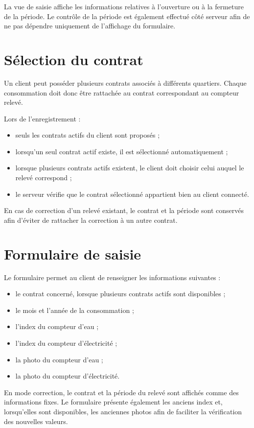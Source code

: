 La vue de saisie affiche les informations relatives à l'ouverture ou à la fermeture de la période. Le contrôle de la période est également effectué côté serveur afin de ne pas dépendre uniquement de l'affichage du formulaire.

\section{Sélection du contrat}

Un client peut posséder plusieurs contrats associés à différents quartiers. Chaque consommation doit donc être rattachée au contrat correspondant au compteur relevé.

Lors de l'enregistrement :
\begin{itemize}
    \item seuls les contrats actifs du client sont proposés ;
    \item lorsqu'un seul contrat actif existe, il est sélectionné automatiquement ;
    \item lorsque plusieurs contrats actifs existent, le client doit choisir celui auquel le relevé correspond ;
    \item le serveur vérifie que le contrat sélectionné appartient bien au client connecté.
\end{itemize}

En cas de correction d'un relevé existant, le contrat et la période sont conservés afin d'éviter de rattacher la correction à un autre contrat.

\section{Formulaire de saisie}

Le formulaire permet au client de renseigner les informations suivantes :
\begin{itemize}
    \item le contrat concerné, lorsque plusieurs contrats actifs sont disponibles ;
    \item le mois et l'année de la consommation ;
    \item l'index du compteur d'eau ;
    \item l'index du compteur d'électricité ;
    \item la photo du compteur d'eau ;
    \item la photo du compteur d'électricité.
\end{itemize}

En mode correction, le contrat et la période du relevé sont affichés comme des informations fixes. Le formulaire présente également les anciens index et, lorsqu'elles sont disponibles, les anciennes photos afin de faciliter la vérification des nouvelles valeurs.

